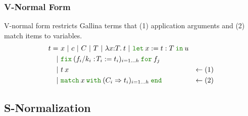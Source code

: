 \documentclass[a4paper,fleqn]{article}
\def\gallina{\textrm{Gallina}}
\newcommand{\kwlet}{\mbox{\color{mygreen}\ttfamily let}}
\newcommand{\kwin}{\mbox{\color{mygreen}\ttfamily in}}
\newcommand{\kwmatch}{\mbox{\color{mygreen}\ttfamily match}}
\newcommand{\kwwith}{\mbox{\color{mygreen}\ttfamily with}}
\newcommand{\kwend}{\mbox{\color{mygreen}\ttfamily end}}
\newcommand{\kwfix}{\mbox{\color{mygreen}\ttfamily fix}}
\newcommand{\kwfor}{\mbox{\color{mygreen}\ttfamily for}}
\newcommand{\lamT}[3]{\lambda #1\mathord{:}#2.\:#3}
\newcommand{\letin}[3]{\kwlet\:#1:=#2\:\kwin\:#3}
\newcommand{\match}[4]{\kwmatch\:#1\:\kwwith\:(#2 \Rightarrow #3)_{#4}\:\kwend}
\newcommand{\fixT}[5]{\kwfix\:(#1:\!#2 := #3)_{#4}\:\kwfor\:#5}
\begin{document}
\subsubsection{V-Normal Form}\label{sec:v-normal-form}
V-normal form restricts \gallina{} terms that (1) application arguments and (2) match items to variables.
\begin{align*}
  t =&\ x~|~c~|~C~|~T~|~\lamT{x}{T}{t}~|~ \letin{x}{t:T}{u} \\
    |&\ \fixT{f_i/k_i}{T_i}{t_i}{i=1\ldots h}{f_j} \\
    |&\ t\:x                               & \leftarrow (1) \\
    |&\ \match{x}{C_i}{t_i}{i=1\ldots h} & \leftarrow (2)
\end{align*}

\subsection{S-Normalization}\label{sec:s-normalization}
\end{document}
